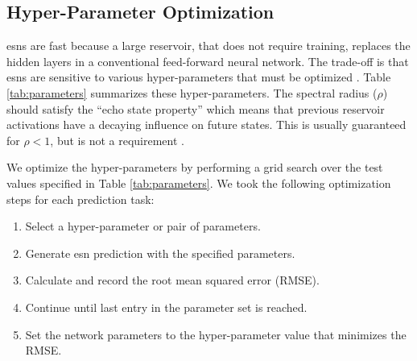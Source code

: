  \subsection{Hyper-Parameter Optimization}

 \glspl{esn} are fast because a large reservoir, that does not require
 training, replaces the hidden layers in a conventional feed-forward neural
 network.
 The trade-off is that \glspl{esn} are sensitive to various hyper-parameters
 that must be optimized \cite{lukosevicius_practical_2012}. Table \ref{tab:parameters} summarizes these hyper-parameters. The spectral radius ($\rho$) should satisfy the ``echo state property'' which means that
 previous reservoir activations have a decaying influence on future states. This
 is usually guaranteed for $\rho < 1$, but is not a requirement
 \cite{lukosevicius_practical_2012}.
 \begin{table}[ht]
   \centering
   \caption{Description of Model Hyper-Parameters}
   \label{tab:parameters}
 \end{table}
 We optimize the hyper-parameters by performing a grid search over the test
 values specified in Table \ref{tab:parameters}. We took the following
 optimization steps for each prediction task:
 \begin{enumerate}
   \item Select a hyper-parameter or pair of parameters.
   \item Generate \gls{esn} prediction with the specified parameters.
   \item Calculate and record the root mean squared error (RMSE).
   \item Continue until last entry in the parameter set is reached.
   \item Set the network parameters to the hyper-parameter value that minimizes the
   RMSE.
 \end{enumerate}
